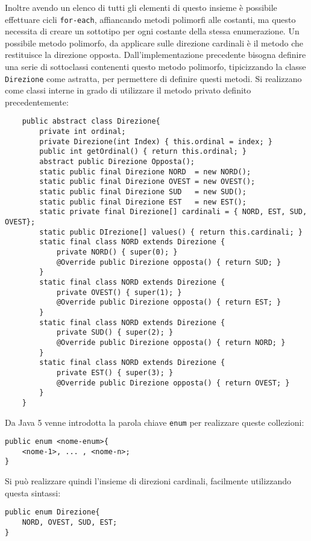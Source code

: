 \documentclass{article}
\numberwithin{equation}{subsection}
\begin{document}
Inoltre avendo un elenco di tutti gli elementi di questo insieme è possibile effettuare cicli \verb|for-each|, affiancando metodi polimorfi alle costanti, ma questo necessita di creare un sottotipo 
per ogni costante della stessa enumerazione. Un possibile metodo polimorfo, da applicare sulle direzione cardinali è il metodo che restituisce la direzione opposta. Dall'implementazione precedente 
bisogna definire una serie di sottoclassi contenenti questo metodo polimorfo, tipicizzando la classe \verb|Direzione| come astratta, per permettere di definire questi metodi. Si realizzano come classi 
interne in grado di utilizzare il metodo privato definito precedentemente:
\begin{verbatim}
    public abstract class Direzione{
        private int ordinal;
        private Direzione(int Index) { this.ordinal = index; }
        public int getOrdinal() { return this.ordinal; }
        abstract public Direzione Opposta();
        static public final Direzione NORD  = new NORD();
        static public final Direzione OVEST = new OVEST();
        static public final Direzione SUD   = new SUD();
        static public final Direzione EST   = new EST();
        static private final Direzione[] cardinali = { NORD, EST, SUD, OVEST};
        static public DIrezione[] values() { return this.cardinali; }
        static final class NORD extends Direzione { 
            private NORD() { super(0); }
            @Override public Direzione opposta() { return SUD; }
        }
        static final class NORD extends Direzione { 
            private OVEST() { super(1); }
            @Override public Direzione opposta() { return EST; }
        }
        static final class NORD extends Direzione { 
            private SUD() { super(2); }
            @Override public Direzione opposta() { return NORD; }
        }
        static final class NORD extends Direzione { 
            private EST() { super(3); }
            @Override public Direzione opposta() { return OVEST; }
        }
    }   
\end{verbatim}

Da Java 5 venne introdotta la parola chiave \verb|enum| per realizzare queste collezioni:
\begin{verbatim}
public enum <nome-enum>{
    <nome-1>, ... , <nome-n>;
}
\end{verbatim}
Si può realizzare quindi l'insieme di direzioni cardinali, facilmente utilizzando questa sintassi:
\begin{verbatim}
public enum Direzione{
    NORD, OVEST, SUD, EST;
}
\end{verbatim}
\end{document}
